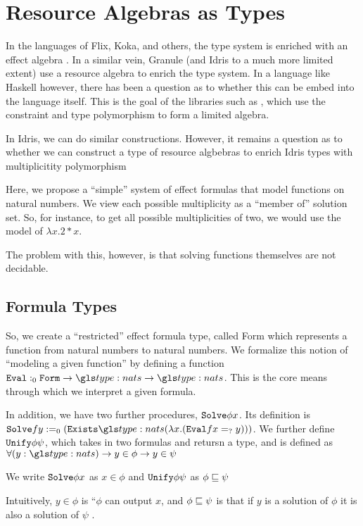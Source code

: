 \section{Resource Algebras as Types}

In the languages of Flix, Koka, and others, the type system is enriched with an effect algebra \cite{flix_paper,koka_1}. 
In a similar vein, Granule (and Idris to a much more limited extent) use a resource algebra to enrich the type system.
In a language like Haskell however, there has been a question as to whether this can be embed into the language itself. 
This is the goal of the libraries such as  \needcite {}, which use the constraint and type polymorphism to form a limited algebra.

In Idris, we can do similar constructions. 
However, it remains a question as to whether we can construct a type of resource algbebras to enrich Idris types with multiplicitity polymorphism 

Here, we propose a ``simple'' system of effect formulas that model functions on natural numbers.
We view each possible multiplicity as a ``member of'' solution set.
So, for instance, to get all possible multiplicities of two, we would use the model of $\lambda x . 2 * x$. 

The problem with this, however, is that solving functions themselves are not decidable.

\subsection{Formula Types} 
So, we create a ``restricted'' effect formula type, called \ident Form which represents a function from natural numbers to natural numbers.
We formalize this notion of ``modeling a given function'' by defining a function $\code{Eval} :_0 \fn{\ident Form }{\fn{\nat}{\nat}}$.
This is the core means through which we interpret a given formula. 

In addition, we have two further procedures, ${\mathtt{Solve}} \phi x$. Its definition is $\ident Solve f y \deq_0 (\code{Exists} \nat (\lambda x . (\code{Eval} f x \peq y)))$.
We further define $\ident Unify \phi \psi$, which takes in two formulas and retursn a type, and is defined as $\fa[y]{\nat}{\fn{y \in \phi}{y \in \psi}}$

\begin{note}
	We write $\ident Solve \phi x$ as $x \in \phi$ and $\ident Unify \phi \psi$ as $\phi \sqsubseteq \psi$
\end{note}
Intuitively, $y \in \phi$ is ``$\phi$ can output $x$, and $\phi \sqsubseteq \psi$ is that if $y$ is a solution of $\phi$ it is also a solution of $\psi$ \cite{granule}.


